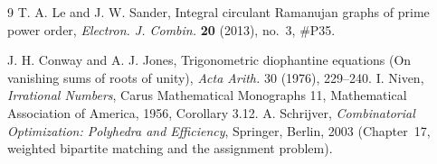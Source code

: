 \documentclass[11pt]{article}
\theoremstyle{definition}
\begin{document}
\begin{thebibliography}{9}
 T. A. Le and J. W. Sander, Integral circulant Ramanujan
  graphs of prime power order, \emph{Electron. J. Combin.} \textbf{20} (2013),
  no.~3, \#P35.

 J. H. Conway and A. J. Jones, Trigonometric diophantine
equations (On vanishing sums of roots of unity),
\emph{Acta Arith.} 30 (1976), 229--240.
 I. Niven, \emph{Irrational Numbers}, Carus Mathematical
Monographs 11, Mathematical Association of America, 1956, Corollary 3.12.
 A. Schrijver, \emph{Combinatorial Optimization: Polyhedra
and Efficiency}, Springer, Berlin, 2003 (Chapter~17, weighted bipartite
matching and the assignment problem).
\end{thebibliography}
\end{document}
